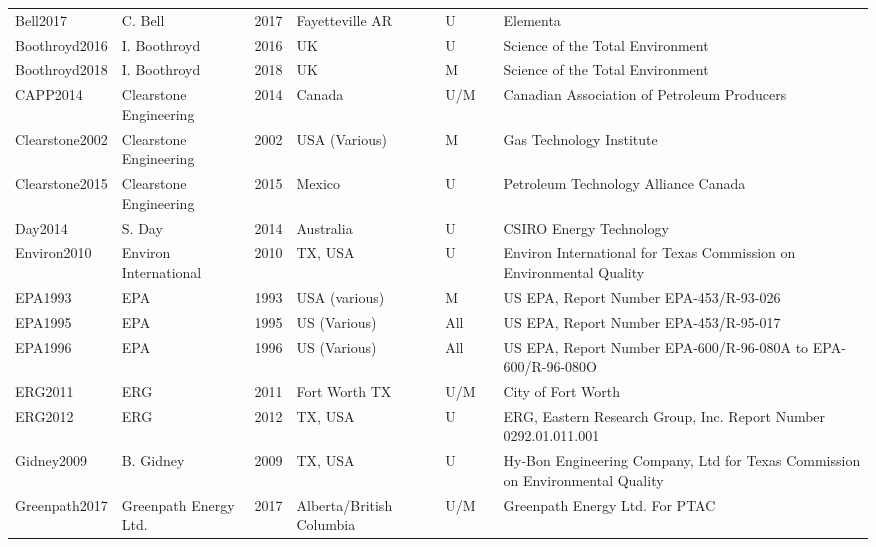 \documentclass[11pt]{report}
\begin{document}
{{{{\begin{landscape}
\begin{table}[]
\begin{scriptsize}
\begin{tabular*}{1\columnwidth}{lllllll}
Bell2017         		& C. Bell      		& 2017 	& Fayetteville AR	& U     	&\cite{Bell2017}     & Elementa\\
Boothroyd2016     	& I. Boothroyd 	& 2016 	& UK   		& U     	& \cite{Boothroyd2016}& Science of the Total Environment      \\
Boothroyd2018     	& I. Boothroyd 	& 2018 	& UK   		& M     	& \cite{Boothroyd2018}        & Science of the Total Environment      \\
CAPP2014	& Clearstone Engineering & 2014 	& Canada         	& U/M   	& \cite{CAPP2014} & Canadian Association of Petroleum Producers     \\
Clearstone2002   	& Clearstone Engineering & 2002 	& USA (Various)  	& M     	& \cite{Clearstone2002}  & Gas Technology Institute    \\
Clearstone2015    	& Clearstone Engineering & 2015 	& Mexico         	& U     	& \cite{Clearstone2015}     & Petroleum Technology Alliance Canada  \\
Day2014 	& S. Day       		& 2014 	& Australia      		& U     	& \cite{Day2014}    & CSIRO Energy Technology     \\
Environ2010       	& Environ International  	& 2010 	& TX, USA        	& U     	& \cite{Environ2010}    & Environ International for Texas Commission on Environmental Quality \\
EPA1993 	& EPA		& 1993 	& USA (various)  	& M     	& \cite{EPA1993}       & US EPA, Report Number EPA-453/R-93-026\\
EPA1995 	& EPA		& 1995 	& US (Various)   	& All   	& \cite{EPA1995b} & US EPA, Report Number EPA-453/R-95-017\\
EPA1996 	& EPA		& 1996 	& US (Various)   	& All   	& \cite{EPA1996}     & US EPA, Report Number EPA-600/R-96-080A to EPA-600/R-96-080O        \\
ERG2011 	& ERG		& 2011 	& Fort Worth TX  	& U/M   	& \cite{ERG2011}     & City of Fort Worth\\
ERG2012 	& ERG		& 2012 	& TX, USA        	& U     	& \cite{ERG2012}         & ERG, Eastern Research Group, Inc. Report Number 0292.01.011.001     \\
Gidney2009        	& B. Gidney    		& 2009 	& TX, USA        	& U     	& \cite{Gidney2009}     & Hy-Bon Engineering Company, Ltd for Texas Commission on Environmental Quality \\
Greenpath2017     	& Greenpath Energy Ltd.  & 2017 	& Alberta/British Columbia & U/M   	& \cite{Greenpath2017}   & Greenpath Energy Ltd. For PTAC        \\

\end{tabular*}
\end{scriptsize}
\end{table}
\end{landscape}}}}}
\end{document}

